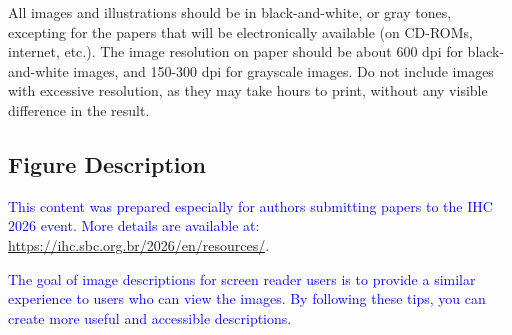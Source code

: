 \documentclass[12pt]{article}
\begin{document}
All images and illustrations should be in black-and-white, or gray tones,
excepting for the papers that will be electronically available (on CD-ROMs,
internet, etc.). The image resolution on paper should be about 600 dpi for
black-and-white images, and 150-300 dpi for grayscale images.  Do not include
images with excessive resolution, as they may take hours to print, without any
visible difference in the result. 

\subsection{Figure Description}

\textcolor{blue}{This content was prepared especially for authors submitting papers to the IHC 2026 event. More details are available at: \url{https://ihc.sbc.org.br/2026/en/resources/}.}

 \textcolor{blue}{The goal of image descriptions for screen reader users is to provide a similar experience to users who can view the images. By following these tips, you can create more useful and accessible descriptions.}
\end{document}
